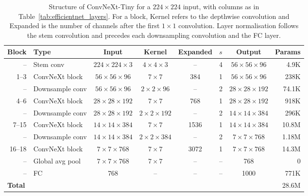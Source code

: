 \begin{table}[!htb]
\centering
\setlength{\tabcolsep}{4pt}
\caption{Structure of ConvNeXt-Tiny for a $224\times224$ input, with columns as in Table~\ref{tab:efficientnet_layers}. For a block, Kernel refers to the depthwise convolution and Expanded is the number of channels after the first $1\times1$ convolution. Layer normalisation follows the stem convolution and precedes each downsampling convolution and the FC layer.}
\label{tab:convnext_layers}
\begin{tabular}{rlcccccr}
\toprule
\textbf{Block} & \textbf{Type} & \textbf{Input} & \textbf{Kernel} & \textbf{Expanded} & $s$ & \textbf{Output} & \textbf{Params} \\
\midrule
--      & Stem conv       & $224\times224\times3$  & $4\times4\times3$   & --   & 4  & $56\times56\times96$  & 4.9K  \\
1--3    & ConvNeXt block  & $56\times56\times96$   & $7\times7$          & 384  & 1  & $56\times56\times96$  & 238K  \\
--      & Downsample conv & $56\times56\times96$   & $2\times2\times96$  & --   & 2  & $28\times28\times192$ & 74.1K \\
4--6    & ConvNeXt block  & $28\times28\times192$  & $7\times7$          & 768  & 1  & $28\times28\times192$ & 918K  \\
--      & Downsample conv & $28\times28\times192$  & $2\times2\times192$ & --   & 2  & $14\times14\times384$ & 296K  \\
7--15   & ConvNeXt block  & $14\times14\times384$  & $7\times7$          & 1536 & 1  & $14\times14\times384$ & 10.8M \\
--      & Downsample conv & $14\times14\times384$  & $2\times2\times384$ & --   & 2  & $7\times7\times768$   & 1.18M \\
16--18  & ConvNeXt block  & $7\times7\times768$    & $7\times7$          & 3072 & 1  & $7\times7\times768$   & 14.3M \\
--      & Global avg pool & $7\times7\times768$    & $7\times7$          & --   & -- & 768                   & 0     \\
--      & FC              & 768                    & --                  & --   & -- & 1000                  & 771K  \\
\midrule
\multicolumn{7}{l}{\textbf{Total}} & 28.6M \\
\bottomrule
\end{tabular}
\end{table}

